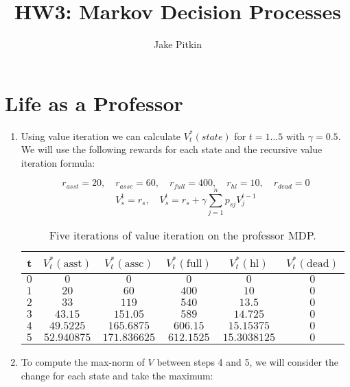 \documentclass[fleqn]{hw}
\title{HW3: Markov Decision Processes}
\institute{University of Utah}
\author{Jake Pitkin}
\begin{document}
\maketitle



\section{Life as a Professor}

\begin{enumerate}

\item Using value iteration we can calculate $V_t^*(state)$ for $t = 1\dots5$ with $\gamma = 0.5$. We will use the following rewards for each state and the recursive value iteration formula:

$$r_{asst} = 20, \quad r_{assc} = 60, \quad r_{full} = 400, \quad r_{hl} = 10, \quad r_{dead} = 0$$
$$V_s^1 = r_s, \quad V_s^t = r_s + \gamma \sum_{j=1}^n p_{sj} V_j^{t-1}$$

\begin{table}[H]
\centering	
\begin{tabular}{|c||c|c|c|c|c|}
\hline
{\bf t} & $V_t^*(\text{asst})$ & $V_t^*(\text{assc})$ & $V_t^*(\text{full})$ & $V_t^*(\text{hl})$ & $V_t^*(\text{dead})$ \\
\hline
$0$ & $0$ & $0$ & $0$ & $0$ & $0$ \\
\hline
$1$ & $20$ & $60$ & $400$ & $10$ & $0$ \\
\hline
$2$ & $33$ & $119$ & $540$ & $13.5$ & $0$ \\
\hline
$3$ & $43.15$ & $151.05$ & $589$ & $14.725$ & $0$ \\
\hline
$4$ & $49.5225$ & $165.6875$ & $606.15$ & $15.15375$ & $0$ \\
\hline
$5$ & $52.940875$ & $171.836625$ & $612.1525$ & $15.3038125$ & $0$ \\
\hline
\end{tabular}
\caption{Five iterations of value iteration on the professor MDP.}
\end{table}

\item To compute the max-norm of $V$ between steps 4 and 5, we will consider the change for each state and take the maximum:


\end{enumerate}
\end{document}
